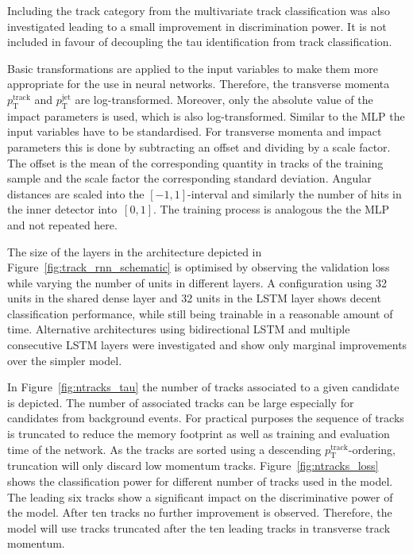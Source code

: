 Including the track category from the multivariate track classification was also
investigated leading to a small improvement in discrimination power. It is not
included in favour of decoupling the tau identification from track
classification.

Basic transformations are applied to the input variables to make them more
appropriate for the use in neural networks. Therefore, the transverse
momenta~$p_\text{T}^\text{track}$ and $p_\text{T}^\text{jet}$ are
log-transformed. Moreover, only the absolute value of the impact parameters is
used, which is also log-transformed. Similar to the MLP the input variables have
to be standardised. For transverse momenta and impact parameters this is done by
subtracting an offset and dividing by a scale factor. The offset is the mean of
the corresponding quantity in tracks of the training sample and the scale factor
the corresponding standard deviation. Angular distances are scaled into the
$[-1, 1]$-interval and similarly the number of hits in the inner detector
into~$[0, 1]$. The training process is analogous the the MLP and not repeated
here.

The size of the layers in the architecture depicted in
Figure~\ref{fig:track_rnn_schematic} is optimised by observing the validation
loss while varying the number of units in different layers. A configuration
using 32 units in the shared dense layer and 32 units in the LSTM layer shows
decent classification performance, while still being trainable in a reasonable
amount of time. Alternative architectures using bidirectional LSTM and multiple
consecutive LSTM layers were investigated and show only marginal improvements
over the simpler model.

In Figure~\ref{fig:ntracks_tau} the number of tracks associated to a given
\tauhadvis candidate is depicted. The number of associated tracks can be large
especially for candidates from background events. For practical purposes the
sequence of tracks is truncated to reduce the memory footprint as well as
training and evaluation time of the network. As the tracks are sorted using a
descending $p_\text{T}^\text{track}$-ordering, truncation will only discard low
momentum tracks. Figure~\ref{fig:ntracks_loss} shows the classification power
for different number of tracks used in the model. The leading six tracks show a
significant impact on the discriminative power of the model. After ten tracks no
further improvement is observed. Therefore, the model will use tracks truncated
after the ten leading tracks in transverse track momentum.

